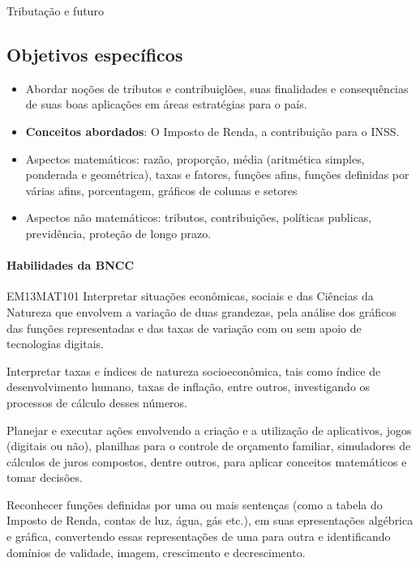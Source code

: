 \begin{paginatexto}{Tributação e futuro}

\raggedcolumns
\subsection*{Objetivos específicos}
\begin{itemize}
\item Abordar noções de tributos e contribuiçlões, suas finalidades e consequências de suas boas aplicações em áreas estratégias para o país.

\item \textbf{Conceitos abordados}: O Imposto de Renda, a contribuição para o INSS.

\item Aspectos matemáticos: razão, proporção, média (aritmética simples, ponderada e geométrica), taxas e fatores, funções afins, funções definidas por várias afins, porcentagem, gráficos de colunas e setores

\item Aspectos não matemáticos: tributos, contribuições, políticas publicas, previdência, proteção de longo prazo.
\end{itemize}

\paragraph{Habilidades da BNCC}

\begin{habilities}{EM13MAT101}
 Interpretar situações econômicas, sociais e das Ciências da Natureza
que envolvem a variação de duas grandezas, pela análise dos gráficos das funções representadas e das taxas de variação com ou sem apoio de tecnologias digitais.


Interpretar taxas e índices de natureza socioeconômica, tais como índice de desenvolvimento humano, taxas de inflação, entre outros, investigando os processos de cálculo desses números.

Planejar e executar ações envolvendo a criação e a utilização de aplicativos, jogos (digitais ou não), planilhas para o controle de orçamento familiar, simuladores de cálculos de juros compostos, dentre outros, para aplicar conceitos matemáticos e tomar decisões. 

Reconhecer funções definidas por uma ou mais sentenças (como a tabela do Imposto de Renda, contas de luz, água, gás etc.), em suas epresentações algébrica e gráfica, convertendo essas representações de uma para outra e identificando domínios de validade, imagem, crescimento e decrescimento.
\end{habilities}


\end{paginatexto}
